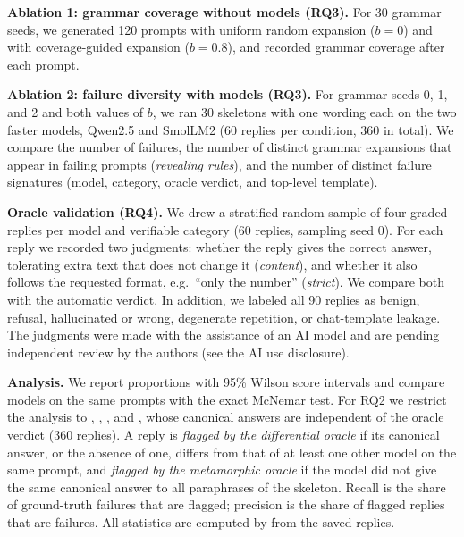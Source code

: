 \textbf{Ablation 1: grammar coverage without models (RQ3).} For 30 grammar seeds, we generated 120 prompts with uniform random expansion ($b = 0$) and with coverage-guided expansion ($b = 0.8$), and recorded grammar coverage after each prompt.

\textbf{Ablation 2: failure diversity with models (RQ3).} For grammar seeds 0, 1, and 2 and both values of $b$, we ran 30 skeletons with one wording each on the two faster models, Qwen2.5 and SmolLM2 (60 replies per condition, 360 in total). We compare the number of failures, the number of distinct grammar expansions that appear in failing prompts (\emph{revealing rules}), and the number of distinct failure signatures (model, category, oracle verdict, and top-level template).

\textbf{Oracle validation (RQ4).} We drew a stratified random sample of four graded replies per model and verifiable category (60 replies, sampling seed 0). For each reply we recorded two judgments: whether the reply gives the correct answer, tolerating extra text that does not change it (\emph{content}), and whether it also follows the requested format, e.g.\ ``only the number'' (\emph{strict}). We compare both with the automatic verdict. In addition, we labeled all 90  replies as benign, refusal, hallucinated or wrong, degenerate repetition, or chat-template leakage. The judgments were made with the assistance of an AI model and are pending independent review by the authors (see the AI use disclosure).

\textbf{Analysis.} We report proportions with 95\% Wilson score intervals and compare models on the same prompts with the exact McNemar test. For RQ2 we restrict the analysis to , , , and , whose canonical answers are independent of the oracle verdict (360 replies). A reply is \emph{flagged by the differential oracle} if its canonical answer, or the absence of one, differs from that of at least one other model on the same prompt, and \emph{flagged by the metamorphic oracle} if the model did not give the same canonical answer to all paraphrases of the skeleton. Recall is the share of ground-truth failures that are flagged; precision is the share of flagged replies that are failures. All statistics are computed by  from the saved replies.
